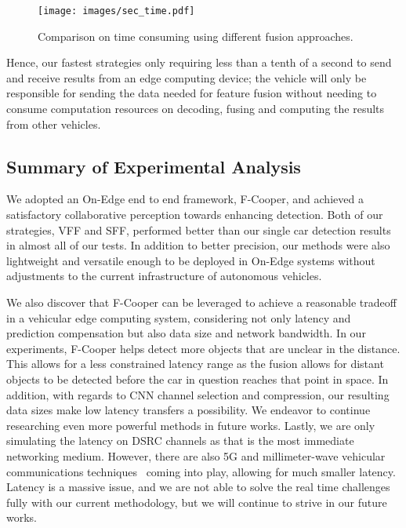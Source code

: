 \documentclass[sigconf]{acmart}
\begin{document}
\begin{figure}[!h]
\vspace{-11pt}
\centering
\texttt{[image: images/sec\_time.pdf]}
\vspace{-11pt}
\caption{Comparison on time consuming using different fusion approaches.}
\vspace{-8pt}
\label{figure:size2}
\end{figure}
Hence, our fastest strategies only requiring less than a tenth of a second to send and receive results from an edge computing device; the vehicle will only be responsible for sending the data needed for feature fusion without needing  to consume computation resources on decoding, fusing and computing the results from other vehicles.











\subsection{Summary of Experimental Analysis}

We adopted an On-Edge end to end framework, F-Cooper, and achieved a satisfactory collaborative perception towards enhancing detection. Both of our strategies, VFF and SFF, performed better than our single car detection results in almost all of our tests. In addition to better precision, our methods were also lightweight and versatile enough to be deployed in On-Edge systems without adjustments to the current infrastructure of autonomous vehicles.



We also discover that F-Cooper can be leveraged to achieve a reasonable tradeoff in a vehicular edge computing system, considering not only latency and prediction compensation but also data size and network bandwidth.
In our experiments, F-Cooper helps detect more objects that are unclear in the distance. This allows for a less constrained latency range as
the fusion allows for distant objects to be detected before the car in question reaches
that point in space.
In addition, with regards to CNN channel selection and compression, our resulting data sizes make low latency transfers a possibility.
We endeavor to continue researching even more powerful methods in future works.
Lastly, we are only simulating the latency on DSRC channels as that is the most immediate
networking medium. However, there are also 5G and millimeter-wave vehicular communications techniques~\cite{va2016millimeter} coming into play, allowing for much smaller latency.
Latency is a massive issue, and we are not able to solve the real time challenges fully
with our current methodology, but we will continue to strive in our future works.
\end{document}
